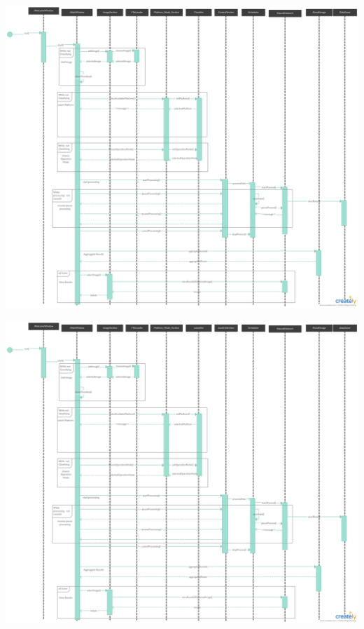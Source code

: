 \documentclass[parskip=full]{scrartcl}
\begin{document}
\pagebreak

\begin{center}
\includegraphics[angle=90,origin=c,height=0.99\textwidth,trim={0 800 0 0},clip]{seq.png}
\end{center}

\pagebreak

\begin{center}
\includegraphics[angle=90,origin=c,height=0.99\textwidth,trim={0 0 0 1000},clip]{seq.png}
\end{center}
\end{document}

